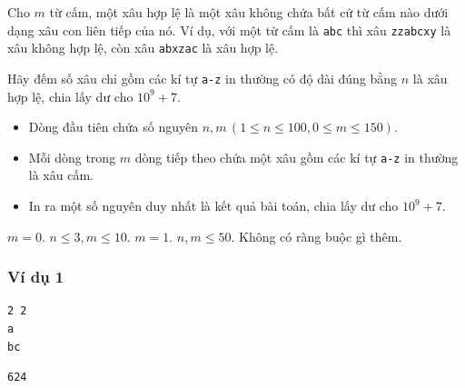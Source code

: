 
\noindent Cho $m$ từ cấm, một xâu hợp lệ là một xâu không chứa bất cứ từ cấm nào dưới dạng xâu con liên tiếp của nó. Ví dụ, với một từ cấm là \texttt{abc} thì xâu \texttt{zzabcxy} là xâu không hợp lệ, còn xâu \texttt{abxzac} là xâu hợp lệ.

\noindent Hãy đếm số xâu chỉ gồm các kí tự \texttt{a-z} in thường có độ dài đúng bằng $n$ là xâu hợp lệ, chia lấy dư cho $10^{9} + 7$.

\begin{itemize}
    \item Dòng đầu tiên chứa số nguyên $n, m \, (1 \le n \le 100, 0 \le m \le 150)$.
    \item Mỗi dòng trong $m$ dòng tiếp theo chứa một xâu gồm các kí tự \texttt{a-z} in thường là xâu cấm.
\end{itemize}

\begin{itemize}
    \item In ra một số nguyên duy nhất là kết quả bài toán, chia lấy dư cho $10^{9} + 7$.
\end{itemize}

\begin{makesubtasks}
     $m = 0$.
     $n \le 3, m \le 10$.
     $m = 1$.
     $n, m \le 50$.
     Không có ràng buộc gì thêm.
\end{makesubtasks}


\subsubsection*{Ví dụ 1}
\begin{makesample}
\begin{lstlisting}
2 2
a
bc
\end{lstlisting}
\nextsample
\begin{lstlisting}
624
\end{lstlisting}
\end{makesample}
